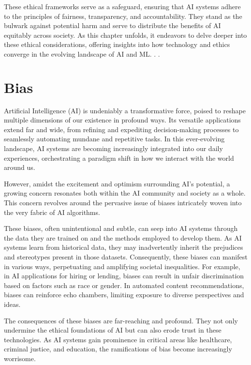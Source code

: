 \documentclass[12pt,a4paper,openright,twoside]{book}
\begin{document}
These ethical frameworks serve as a safeguard, ensuring that AI systems adhere to the principles of fairness, transparency, and accountability. They stand as the bulwark against potential harm and serve to distribute the benefits of AI equitably across society. As this chapter unfolds, it endeavors to delve deeper into these ethical considerations, offering insights into how technology and ethics converge in the evolving landscape of AI and ML. \cite{GRUETZEMACHER202210288}. \cite{GRUETZEMACHER202210288}.

\newpage
\section{Bias}
Artificial Intelligence (AI) is undeniably a transformative force, poised to reshape multiple dimensions of our existence in profound ways. Its versatile applications extend far and wide, from refining and expediting decision-making processes to seamlessly automating mundane and repetitive tasks. In this ever-evolving landscape, AI systems are becoming increasingly integrated into our daily experiences, orchestrating a paradigm shift in how we interact with the world around us. 

However, amidst the excitement and optimism surrounding AI's potential, a growing concern resonates both within the AI community and society as a whole. This concern revolves around the pervasive issue of biases intricately woven into the very fabric of AI algorithms. 

These biases, often unintentional and subtle, can seep into AI systems through the data they are trained on and the methods employed to develop them. As AI systems learn from historical data, they may inadvertently inherit the prejudices and stereotypes present in those datasets. Consequently, these biases can manifest in various ways, perpetuating and amplifying societal inequalities. For example, in AI applications for hiring or lending, biases can result in unfair discrimination based on factors such as race or gender. In automated content recommendations, biases can reinforce echo chambers, limiting exposure to diverse perspectives and ideas. 

The consequences of these biases are far-reaching and profound. They not only undermine the ethical foundations of AI but can also erode trust in these technologies. As AI systems gain prominence in critical areas like healthcare, criminal justice, and education, the ramifications of bias become increasingly worrisome. 
\end{document}
